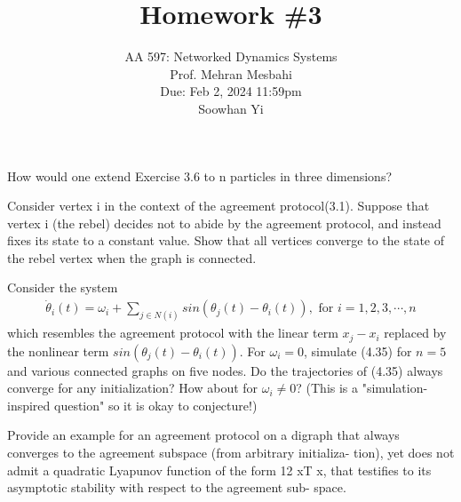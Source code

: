 \documentclass{article}
\begin{document}
\setcounter{problem}{0}
\title{Homework \#3}
\author{
    \normalsize{AA 597: Networked Dynamics Systems}\\
    \normalsize{Prof. Mehran Mesbahi}\\
    \normalsize{Due: Feb 2, 2024 11:59pm}\\
    \normalsize{Soowhan Yi}
}
\date{{}}
\maketitle


\begin{problem}
    How would one extend Exercise 3.6 to n particles in three dimensions?
\end{problem}
\begin{problem}
    Consider vertex i in the context of the agreement protocol(3.1). Suppose that vertex i (the rebel) decides not to abide by the agreement protocol, and instead ﬁxes its state to a constant value. Show that all vertices converge to the state of the rebel vertex when the graph is connected.
\end{problem}
\begin{problem}
    Consider the system
    \begin{align*}
        \dot{\theta}_i(t) = \omega_i + \sum_{j \in N(i)} sin(\theta_j(t) - \theta_i(t)), \text{  for } i = 1, 2, 3, \cdots, n
    \end{align*}
    which resembles the agreement protocol with the linear term $x_j - x_i$ replaced by the nonlinear term $sin(\theta_j(t) - \theta_i(t))$. For $\omega_i = 0$, simulate (4.35) for $n = 5$ and various connected graphs on five nodes. Do the trajectories of (4.35) always converge for any initialization? How about for $\omega_i \neq 0$? (This is a "simulation-inspired question" so it is okay to conjecture!) 
\end{problem}
\begin{problem}
    Provide an example for an agreement protocol on a digraph
that always converges to the agreement subspace (from arbitrary initializa-
tion), yet does not admit a quadratic Lyapunov function of the form 12 xT x,
that testiﬁes to its asymptotic stability with respect to the agreement sub-
space.
\end{problem}
\end{document}

